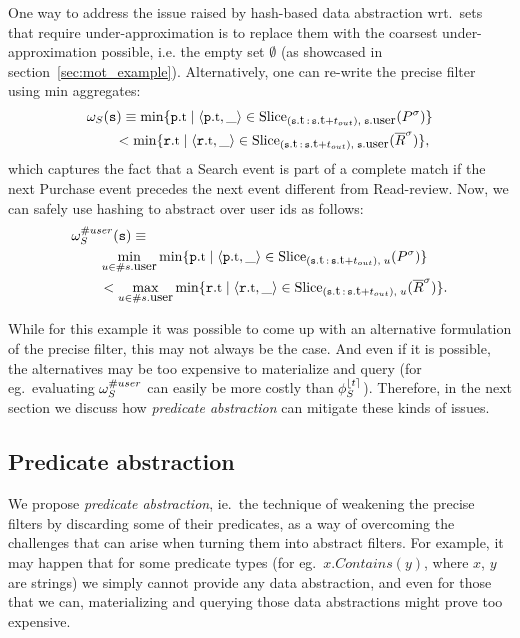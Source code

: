 One way to address the issue raised by hash-based data abstraction wrt.\ sets 
that require under-approximation is to replace them with the coarsest 
under-approximation possible, i.e. the empty set $\emptyset$ (as showcased in 
section~\ref{sec:mot_example}).
Alternatively, one can re-write the precise filter using min aggregates:
\begin{align*}
&
\PrecedesPP(\symv{s}) \equiv 
\min \{ 
\facc{\symv{p}}{t} \mid 
\tuple{\facc{\symv{p}}{t}, \_} \in 
\slice{\syms{P}}
{(\facc{\symv{s}}{t}\,:\,\facc{\symv{s}}{t} + t_{out}),\; 
	\facc{\symv{s}}{user}}
\}
\\
&\qquad
< \min \{ 
\facc{\symv{r}}{t} \mid 
\tuple{\facc{\symv{r}}{t}, \_} \in 
\slice{\syms{\oR}}
{(\facc{\symv{s}}{t}\,:\,\facc{\symv{s}}{t} + t_{out}),\; 
	\facc{\symv{s}}{user}} 
\},
\end{align*}
which captures the fact that a Search event is part of a complete match if the 
next Purchase event precedes the next event different from Read-review.
Now, we can safely use hashing to abstract over user ids as follows:
\begin{align*}
&
\PrecedesPP^{\hashid{user}}(\symv{s}) \equiv 
\\
&\qquad
\min_{u \in \hashid{\facc{s}{user}}}
\min \{ 
\facc{\symv{p}}{t} \mid 
\tuple{\facc{\symv{p}}{t}, \_} \in 
\slice{\syms{P}}
{(\facc{\symv{s}}{t}\,:\,\facc{\symv{s}}{t} + t_{out}),\; 
	u}
\}
\\
&\qquad
< 
\max_{u \in \hashid{\facc{s}{user}}}
\min \{ 
\facc{\symv{r}}{t} \mid 
\tuple{\facc{\symv{r}}{t}, \_} \in 
\slice{\syms{\oR}}
{(\facc{\symv{s}}{t}\,:\,\facc{\symv{s}}{t} + t_{out}),\; 
	u} 
\}.
\end{align*}

While for this example it was possible to come up with an alternative 
formulation of the precise filter, this may not always be the case. 
And even if it is possible, the alternatives may be too expensive to
materialize and query (for eg.\ evaluating $\omega_S^{\# user}$ can 
easily be more costly than $\phi_{S}^{\lfloor t \rceil}$).
Therefore, in the next section we discuss how {\em predicate abstraction} can 
mitigate these kinds of issues.

\subsection{Predicate abstraction}
\label{sec:pred_abstraction}


We propose {\em predicate abstraction}, ie.\ the technique of weakening
 the
precise filters by discarding some of their predicates, as a way of
 overcoming
the challenges that can arise when turning them into abstract 
filters.
For example, it may happen that for some predicate types
(for eg.\ $x.Contains(y)$, where $x$, $y$ are strings) we simply cannot
 provide
any data abstraction, and even for those that we can, materializing and
 querying
those data abstractions might prove too expensive.




